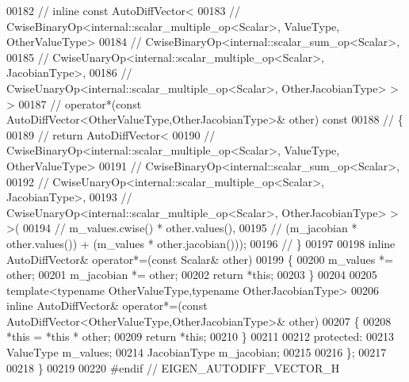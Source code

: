 \begin{DoxyCode}
00182 \textcolor{comment}{//     inline const AutoDiffVector<}
00183 \textcolor{comment}{//       CwiseBinaryOp<internal::scalar\_multiple\_op<Scalar>, ValueType, OtherValueType>}
00184 \textcolor{comment}{//       CwiseBinaryOp<internal::scalar\_sum\_op<Scalar>,}
00185 \textcolor{comment}{//         CwiseUnaryOp<internal::scalar\_multiple\_op<Scalar>, JacobianType>,}
00186 \textcolor{comment}{//         CwiseUnaryOp<internal::scalar\_multiple\_op<Scalar>, OtherJacobianType> > >}
00187 \textcolor{comment}{//     operator*(const AutoDiffVector<OtherValueType,OtherJacobianType>& other) const}
00188 \textcolor{comment}{//     \{}
00189 \textcolor{comment}{//       return AutoDiffVector<}
00190 \textcolor{comment}{//         CwiseBinaryOp<internal::scalar\_multiple\_op<Scalar>, ValueType, OtherValueType>}
00191 \textcolor{comment}{//         CwiseBinaryOp<internal::scalar\_sum\_op<Scalar>,}
00192 \textcolor{comment}{//           CwiseUnaryOp<internal::scalar\_multiple\_op<Scalar>, JacobianType>,}
00193 \textcolor{comment}{//           CwiseUnaryOp<internal::scalar\_multiple\_op<Scalar>, OtherJacobianType> > >(}
00194 \textcolor{comment}{//             m\_values.cwise() * other.values(),}
00195 \textcolor{comment}{//             (m\_jacobian * other.values()) + (m\_values * other.jacobian()));}
00196 \textcolor{comment}{//     \}}
00197 
00198     \textcolor{keyword}{inline} AutoDiffVector& operator*=(\textcolor{keyword}{const} Scalar& other)
00199     \{
00200       m\_values *= other;
00201       m\_jacobian *= other;
00202       \textcolor{keywordflow}{return} *\textcolor{keyword}{this};
00203     \}
00204 
00205     \textcolor{keyword}{template}<\textcolor{keyword}{typename} OtherValueType,\textcolor{keyword}{typename} OtherJacobianType>
00206     \textcolor{keyword}{inline} AutoDiffVector& operator*=(\textcolor{keyword}{const} AutoDiffVector<OtherValueType,OtherJacobianType>& other)
00207     \{
00208       *\textcolor{keyword}{this} = *\textcolor{keyword}{this} * other;
00209       \textcolor{keywordflow}{return} *\textcolor{keyword}{this};
00210     \}
00211 
00212   \textcolor{keyword}{protected}:
00213     ValueType m\_values;
00214     JacobianType m\_jacobian;
00215 
00216 \};
00217 
00218 \}
00219 
00220 \textcolor{preprocessor}{#endif // EIGEN\_AUTODIFF\_VECTOR\_H}
\end{DoxyCode}
